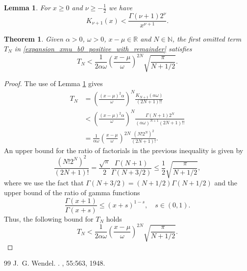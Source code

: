 \documentclass[10pt,a4paper]{amsart}
\newtheorem{lemma}{Lemma}
\newtheorem{theorem}{Theorem}
\begin{document}
\begin{lemma}\label{lemma_1}
For $x \ge 0$ and $\nu \ge -\frac{1}{2}$ we have
\begin{equation}
K_{\nu + 1}(x) < \frac{\Gamma(\nu + 1)2^{\nu}}{x^{\nu + 1}}.
\end{equation}
\end{lemma}

\begin{theorem}\label{theorem_expansion_xmu_b0_postivie_remainder}
Given $\alpha > 0$, $\omega > 0$, $x-\mu \in \mathbb{R}$ and $N \in \mathbb{N}$, the first omitted term $T_N$ in \eqref{expansion_xmu_b0_positive_with_remainder} satisfies
\begin{equation}\label{bound_TN_xmu_b0_positive}
T_N < \frac{1}{2\alpha\omega}\left(\frac{x-\mu}{\omega}\right)^{2N} \sqrt{\frac{\pi}{N + 1/2}}.
\end{equation}
\end{theorem}

\begin{proof}
The use of Lemma \ref{lemma_1} gives
\begin{align*}
T_N &= \left(\frac{(x-\mu)^2 \alpha}{\omega}\right)^N \frac{K_{N+1}(\alpha \omega)}{(2N +1)!!}\\
&<  \left(\frac{(x-\mu)^2 \alpha}{\omega}\right)^N \frac{\Gamma(N + 1)2^N}{(\alpha\omega)^{N + 1}(2N +1)!!}\\
&= \frac{1}{\alpha\omega}\left(\frac{x-\mu}{\omega}\right)^{2N} \frac{(N! 2^N)^2}{(2N + 1)!}.
\end{align*}
An upper bound for the ratio of factorials in the previous inequality is given by
\begin{equation*}
\frac{(N! 2^N)^2}{(2N + 1)!} = \frac{\sqrt{\pi}}{2}\frac{\Gamma(N+1)}{\Gamma(N + 3/2)} \le \frac{1}{2}\sqrt{\frac{\pi}{N + 1/2}},
\end{equation*}
where we use the fact that $\Gamma(N + 3/2) = (N + 1/2) \Gamma(N + 1/2)$ and the upper bound of the ratio of gamma functions \cite{Wendel1948}
\begin{equation}
\frac{\Gamma(x + 1)}{\Gamma(x+s)} \le (x + s)^{1-s}, \quad s \in (0, 1).
\end{equation}
Thus, the following bound for $T_N$ holds
\begin{equation}
T_N < \frac{1}{2\alpha\omega}\left(\frac{x-\mu}{\omega}\right)^{2N} \sqrt{\frac{\pi}{N + 1/2}}.
\end{equation}
\end{proof}

\begin{thebibliography}{99}
 J.~G. Wendel. . , 55:563, 1948.
\end{thebibliography}
\end{document}
